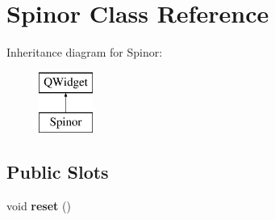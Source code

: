 \hypertarget{class_spinor}{}\section{Spinor Class Reference}
\label{class_spinor}
Inheritance diagram for Spinor\+:\begin{figure}[H]
\begin{center}
\leavevmode
\includegraphics[height=2.000000cm]{class_spinor}
\end{center}
\end{figure}
\subsection*{Public Slots}
\begin{DoxyCompactItemize}
\item 
void {\bfseries reset} ()\hypertarget{class_spinor_a372c8663dc0dc9e049a21fc6c6f37210}{}\label{class_spinor_a372c8663dc0dc9e049a21fc6c6f37210}

\end{DoxyCompactItemize}
